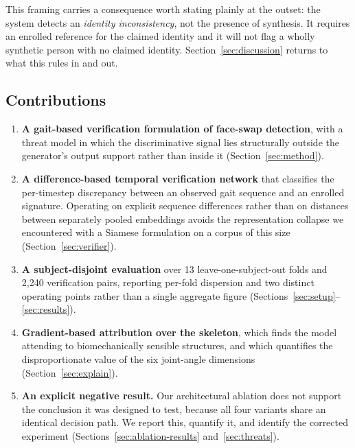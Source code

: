 \documentclass[journal]{IEEEtran}
\begin{document}
This framing carries a consequence worth stating plainly at the outset: the
system detects an \emph{identity inconsistency}, not the presence of synthesis.
It requires an enrolled reference for the claimed identity and it will not flag
a wholly synthetic person with no claimed identity. Section~\ref{sec:discussion}
returns to what this rules in and out.

\subsection{Contributions}

\begin{enumerate}
\item \textbf{A gait-based verification formulation of face-swap detection},
      with a threat model in which the discriminative signal lies structurally
      outside the generator's output support rather than inside it
      (Section~\ref{sec:method}).
\item \textbf{A difference-based temporal verification network} that classifies
      the per-timestep discrepancy between an observed gait sequence and an
      enrolled signature. Operating on explicit sequence differences rather
      than on distances between separately pooled embeddings avoids the
      representation collapse we encountered with a Siamese formulation on a
      corpus of this size (Section~\ref{sec:verifier}).
\item \textbf{A subject-disjoint evaluation} over 13 leave-one-subject-out
      folds and 2{,}240 verification pairs, reporting per-fold dispersion and
      two distinct operating points rather than a single aggregate figure
      (Sections~\ref{sec:setup}--\ref{sec:results}).
\item \textbf{Gradient-based attribution over the skeleton}, which finds the
      model attending to biomechanically sensible structures, and which
      quantifies the disproportionate value of the six joint-angle dimensions
      (Section~\ref{sec:explain}).
\item \textbf{An explicit negative result.} Our architectural ablation does not
      support the conclusion it was designed to test, because all four variants
      share an identical decision path. We report this, quantify it, and
      identify the corrected experiment (Sections~\ref{sec:ablation-results}
      and~\ref{sec:threats}).
\end{enumerate}

\end{document}
